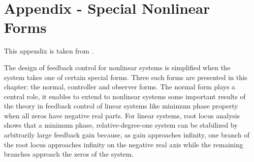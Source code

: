 \documentclass[11pt,a4paper,oneside]{book}
\numberwithin{equation}{section}
\theoremstyle{it}
\theoremstyle{definition}
\begin{document}
\chapter{Appendix - Special Nonlinear Forms}
This appendix is taken from \cite{khalil_2}. 

The design of feedback control for nonlinear systems is simplified when the 
system takes one of certain special forms. Three such forms are presented in 
this chapter: the normal, controller and observer forms. The normal form plays 
a central role, it enables to extend to nonlinear systems some important 
results of the theory in feedback control of linear systems like minimum phase 
property when all zeros have negative real parts. For linear systems, root 
locus analysis shows that a minimum phase, relative-degree-one system can be 
stabilized by arbitrarily large feedback gain because, as gain approaches 
infinity, one branch of the root locus approaches infinity on the negative real 
axis while the remaining branches approach the zeros of the system.
\end{document}
